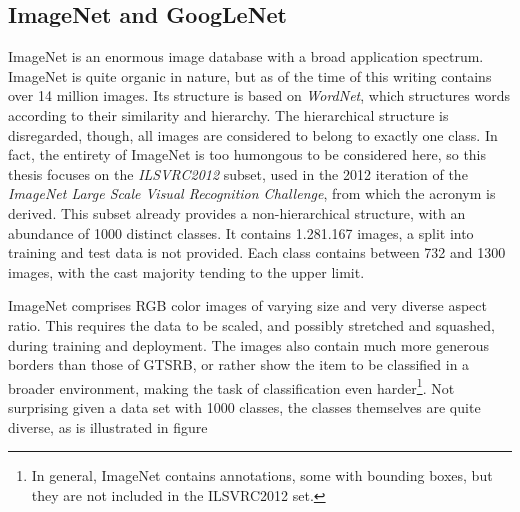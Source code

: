 \documentclass[11pt, a4paper]{article}
\begin{document}
\subsection{ImageNet and GoogLeNet}
\label{sec:generation-large-sets:imagenet}
ImageNet \cite{imagenet-large-scale-hierarchical-image-database} is an enormous image database with a broad application spectrum. ImageNet is quite organic in nature, but as of the time of this writing contains over 14 million images. Its structure is based on \emph{WordNet}, which structures words according to their similarity and hierarchy. The hierarchical structure is disregarded, though, all images are considered to belong to exactly one class. In fact, the entirety of ImageNet is too humongous to be considered here, so this thesis focuses on the \emph{ILSVRC2012} subset, used in the 2012 iteration of the \emph{ImageNet Large Scale Visual Recognition Challenge}, from which the acronym is derived. This subset already provides a non-hierarchical structure, with an abundance of 1000 distinct classes. It contains 1.281.167 images, a split into training and test data is not provided. Each class contains between 732 and 1300 images, with the cast majority tending to the upper limit.

ImageNet comprises RGB color images of varying size and very diverse aspect ratio. This requires the data to be scaled, and possibly stretched and squashed, during training and deployment. The images also contain much more generous borders than those of GTSRB, or rather show the item to be classified in a broader environment, making the task of classification even harder\footnote{In general, ImageNet contains annotations, some with bounding boxes, but they are not included in the ILSVRC2012 set.}. Not surprising given a data set with 1000 classes, the classes themselves are quite diverse, as is illustrated in figure 
\end{document}
